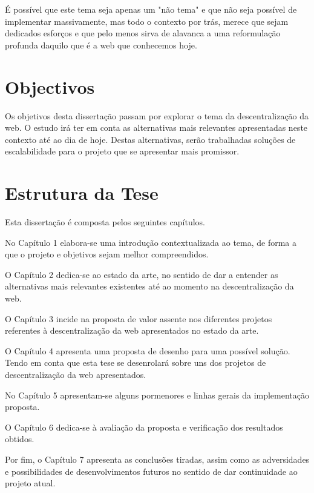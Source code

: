 É possível que este tema seja apenas um "não tema" e que não seja possível de implementar massivamente, mas todo o contexto por trás, merece que sejam dedicados esforços e que pelo menos sirva de alavanca a uma reformulação profunda daquilo que é a web que conhecemos hoje.

\section{Objectivos}
Os objetivos desta dissertação passam por explorar o tema da descentralização da web. O estudo irá ter em conta as alternativas mais relevantes apresentadas neste contexto até ao dia de hoje. Destas alternativas, serão trabalhadas soluções de escalabilidade para o projeto que se apresentar mais promissor.

\section{Estrutura da Tese}

Esta dissertação é composta pelos seguintes capítulos.

No Capítulo 1 elabora-se uma introdução contextualizada ao tema, de forma a que o projeto e objetivos sejam melhor compreendidos.

O Capítulo 2 dedica-se ao estado da arte, no sentido de dar a entender as alternativas mais relevantes existentes até ao momento na descentralização da web.

O Capítulo 3 incide na proposta de valor assente nos diferentes projetos referentes à descentralização da web apresentados no estado da arte.

O Capítulo 4 apresenta uma proposta de desenho para uma possível solução. Tendo em conta que esta tese se desenrolará sobre uns dos projetos de descentralização da web apresentados.

No Capítulo 5 apresentam-se alguns pormenores e linhas gerais da implementação proposta.

O Capítulo 6 dedica-se à avaliação da proposta e verificação dos resultados obtidos.

Por fim, o Capítulo 7 apresenta as conclusões tiradas, assim como as adversidades e possibilidades de desenvolvimentos futuros no sentido de dar continuidade ao projeto atual.